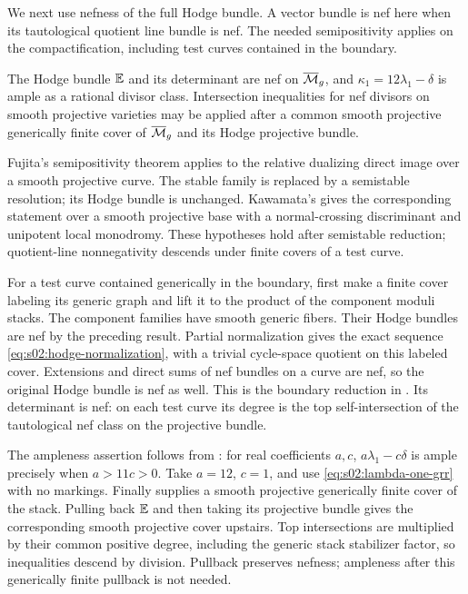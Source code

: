 We next use nefness of the full Hodge bundle. A vector bundle is
nef here when its tautological quotient line bundle is nef.
The needed semipositivity applies on the compactification, including
test curves contained in the boundary.

\begin{lmm}\label{lmm:s08:nef}
The Hodge bundle $\mathbb{E}$ and its determinant are nef on $\overline{\mathcal{M}}_g$,
and $\kappa_1=12\lambda_1-\delta$ is ample as a rational divisor
class. Intersection inequalities for nef divisors on smooth
projective varieties may be applied after a common smooth
projective generically finite cover of $\overline{\mathcal{M}}_g$ and its Hodge
projective bundle.
\end{lmm}
\begin{prf}
Fujita's semipositivity theorem \cite[Main Theorem (0.6)]{Fuj78}
applies to the relative dualizing direct image over a smooth
projective curve. The stable family is replaced by a semistable
resolution; its Hodge bundle is unchanged. Kawamata's
\cite[Theorem 5]{Kaw81} gives the corresponding statement over a
smooth projective base with a normal-crossing discriminant and
unipotent local monodromy. These hypotheses hold after semistable
reduction; quotient-line nonnegativity descends under finite
covers of a test curve.

For a test curve contained generically in the boundary, first make
a finite cover labeling its generic graph and lift it to the
product of the component moduli stacks. The component families
have smooth generic fibers. Their Hodge bundles are nef by the
preceding result. Partial normalization gives the exact sequence
\eqref{eq:s02:hodge-normalization}, with a trivial cycle-space
quotient on this labeled cover. Extensions and direct sums of nef
bundles on a curve are nef, so the original Hodge bundle is nef as
well. This is the boundary reduction in
\cite[Proposition 4.4]{LX26b}. Its determinant is nef: on each
test curve its degree is the top self-intersection of the
tautological nef class on the projective bundle.

The ampleness assertion follows from
\cite[Theorem (1.3)]{CH88}: for real coefficients $a,c$,
$a\lambda_1-c\delta$ is ample precisely when $a>11c>0$.
Take $a=12$, $c=1$, and use
\eqref{eq:s02:lambda-one-grr} with no markings.
Finally \cite[Proposition 6.1, $m=0$]{LX26b} supplies a smooth
projective generically finite cover of the stack. Pulling back
$\mathbb{E}$ and then taking its projective bundle gives the corresponding
smooth projective cover upstairs. Top intersections are multiplied
by their common positive degree, including the generic stack
stabilizer factor, so inequalities descend by division. Pullback
preserves nefness; ampleness after this generically finite
pullback is not needed.
\end{prf}

